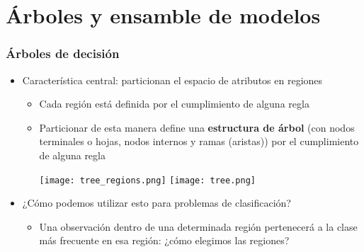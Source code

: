 \documentclass[leqno, 10pt, envcountsect]{beamer}
\numberwithin{equation}{section}
\theoremstyle{definition}
\theoremstyle{example}
\numberwithin{figure}{section}
\numberwithin{table}{section}
\let\olditem\item
\renewcommand{\item}{%
\olditem\vspace{1pt}}
\begin{document}
\section{Árboles y ensamble de modelos}
\label{sec:arboles_y_modelos_de_}

\begin{frame}[fragile=singleslide]
  \frametitle{Árboles de decisión}
  \begin{itemize}
    \item Característica central: particionan el espacio de atributos en
      regiones
      \begin{itemize}
        \item Cada región está definida por el cumplimiento de alguna regla
        \item Particionar de esta manera define una \textbf{estructura de árbol}
          (con nodos terminales o hojas, nodos internos y ramas (aristas))
          por el cumplimiento de alguna regla
          \begin{center}
            \texttt{[image: tree\_regions.png]}
            \texttt{[image: tree.png]}
          \end{center}
      \end{itemize}
    \item ¿Cómo podemos utilizar esto para problemas de clasificación?
      \begin{itemize}
        \item Una observación dentro de una determinada región pertenecerá a la
          clase más frecuente en esa región: ¿cómo elegimos las regiones?
      \end{itemize}
  \end{itemize}
\end{frame}
\end{document}
